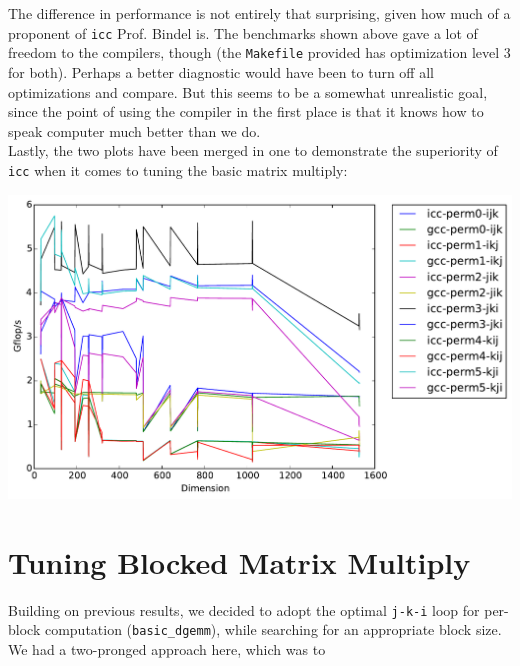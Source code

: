\documentclass[11pt]{article}
\begin{document}
\noindent The difference in performance is not entirely that surprising, given how much of a proponent of \texttt{icc} Prof. Bindel is.  The benchmarks shown above gave a lot of freedom to the compilers, though (the \texttt{Makefile} provided has optimization level 3 for both).  Perhaps a better diagnostic would have been to turn off all optimizations and compare.  But this seems to be a somewhat unrealistic goal, since the point of using the compiler in the first place is that it knows how to speak computer much better than we do.\\

\noindent Lastly, the two plots have been merged in one to demonstrate the superiority of \texttt{icc} when it comes to tuning the basic matrix multiply:

\begin{center}
    \includegraphics[scale=0.5]{benchmarking/permutations/timing_both.pdf}
\end{center}

\section{Tuning Blocked Matrix Multiply}

Building on previous results, we decided to adopt the optimal \texttt{j-k-i} loop for per-block computation (\texttt{basic\_dgemm}), while searching for an appropriate block size.  We had a two-pronged approach here, which was to
\end{document}
